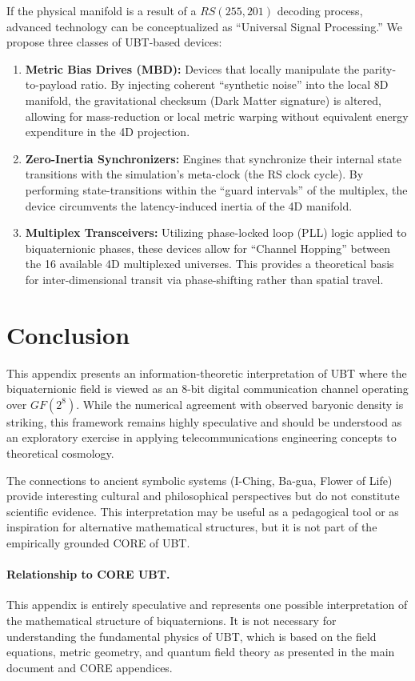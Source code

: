 If the physical manifold is a result of a $RS(255, 201)$ decoding process, advanced technology can be conceptualized as ``Universal Signal Processing.'' We propose three classes of UBT-based devices:

\begin{enumerate}
    \item \textbf{Metric Bias Drives (MBD):} Devices that locally manipulate the parity-to-payload ratio. By injecting coherent ``synthetic noise'' into the local 8D manifold, the gravitational checksum (Dark Matter signature) is altered, allowing for mass-reduction or local metric warping without equivalent energy expenditure in the 4D projection.
    \item \textbf{Zero-Inertia Synchronizers:} Engines that synchronize their internal state transitions with the simulation's meta-clock (the RS clock cycle). By performing state-transitions within the ``guard intervals'' of the multiplex, the device circumvents the latency-induced inertia of the 4D manifold.
    \item \textbf{Multiplex Transceivers:} Utilizing phase-locked loop (PLL) logic applied to biquaternionic phases, these devices allow for ``Channel Hopping'' between the 16 available 4D multiplexed universes. This provides a theoretical basis for inter-dimensional transit via phase-shifting rather than spatial travel.
\end{enumerate}

\section{Conclusion}

This appendix presents an information-theoretic interpretation of UBT where the biquaternionic field is viewed as an 8-bit digital communication channel operating over $GF(2^8)$. While the numerical agreement with observed baryonic density is striking, this framework remains highly speculative and should be understood as an exploratory exercise in applying telecommunications engineering concepts to theoretical cosmology.

The connections to ancient symbolic systems (I-Ching, Ba-gua, Flower of Life) provide interesting cultural and philosophical perspectives but do not constitute scientific evidence. This interpretation may be useful as a pedagogical tool or as inspiration for alternative mathematical structures, but it is not part of the empirically grounded CORE of UBT.

\paragraph{Relationship to CORE UBT.} This appendix is entirely speculative and represents one possible interpretation of the mathematical structure of biquaternions. It is not necessary for understanding the fundamental physics of UBT, which is based on the field equations, metric geometry, and quantum field theory as presented in the main document and CORE appendices.
